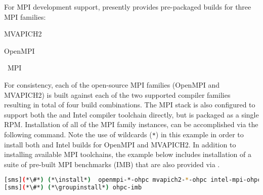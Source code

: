 For MPI development support, \OHPC{} presently provides pre-packaged builds for
three MPI families: 

\begin{itemize*}
\item MVAPICH2
\item OpenMPI
\item \Intel{}~MPI

\end{itemize*}
 For consistency, each of the open-source MPI families (OpenMPI and
 MVAPICH2) is built against each of the two supported compiler families
 resulting in total of four build combinations.  The \Intel{} MPI stack is also
 configured to support both the \GNU{} and Intel compiler toolchain directly, but
 is packaged as a single RPM. Installation of all of the MPI family instances,
 can be accomplished via the following command. Note the use of wildcards
 (\texttt{*}) in this example in order to install both \GNU{} and Intel builds for
 OpenMPI and MVAPICH2. In addition to installing available MPI toolchains,
 the example below includes installation of a suite of pre-built MPI
 benchmarks (IMB) that are also provided via \OHPC{}.

\begin{lstlisting}[language=bash]
[sms](*\#*) (*\install*)  openmpi-*-ohpc mvapich2-*-ohpc intel-mpi-ohpc
[sms](*\#*) (*\groupinstall*) ohpc-imb
\end{lstlisting}
